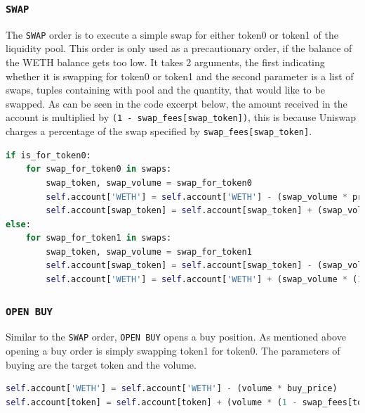 \subsubsection{\texttt{SWAP}}
The \texttt{SWAP} order is to execute a simple swap for either token0 or token1 of the liquidity pool. This order is only used as a precautionary order, if the balance of the WETH balance gets too low. It takes 2 arguments, the first indicating whether it is swapping for token0 or token1 and the second parameter is a list of swaps, tuples containing with pool and the quantity, that would like to be swapped. As can be seen in the code excerpt below, the amount received in the account is multiplied by \texttt{(1 - swap\_fees[swap\_token])}, this is because Uniswap charges a percentage of the swap specified by \texttt{swap\_fees[swap\_token]}.
\vspace{5mm}
\begin{lstlisting}[language=Python]
if is_for_token0:
    for swap_for_token0 in swaps:
        swap_token, swap_volume = swap_for_token0
        self.account['WETH'] = self.account['WETH'] - (swap_volume * prices[f'P{swap_token[1]}'])
        self.account[swap_token] = self.account[swap_token] + (swap_volume * (1 - swap_fees[swap_token]))
else:
    for swap_for_token1 in swaps:
        swap_token, swap_volume = swap_for_token1
        self.account[swap_token] = self.account[swap_token] - (swap_volume / prices[f'P{swap_token[1]}'])
        self.account['WETH'] = self.account['WETH'] + (swap_volume * (1 - swap_fees[swap_token]))
\end{lstlisting}

\subsubsection{\texttt{OPEN\ BUY}}
Similar to the \texttt{SWAP} order, \texttt{OPEN\ BUY} opens a buy position. As mentioned above opening a buy order is simply swapping token1 for token0. The parameters of buying are the target token and the volume. 
\vspace{5mm}
\begin{lstlisting}[language=Python]
self.account['WETH'] = self.account['WETH'] - (volume * buy_price)
self.account[token] = self.account[token] + (volume * (1 - swap_fees[token]))
\end{lstlisting}

